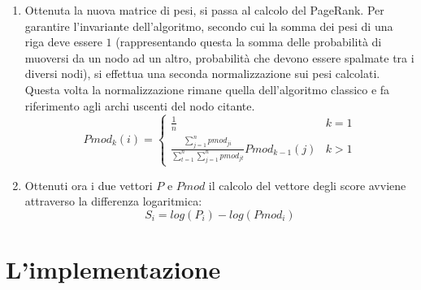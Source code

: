 \documentclass[a4paper, 12pt]{article}
\let\oldsection\section
\renewcommand\section{\clearpage\oldsection}
\newcommand{\pagerankModificato}{Pmod}
\newcommand{\pesiPagerankModificato}{pmod}
\begin{document}
\begin{enumerate}
  \item 
  Ottenuta la nuova matrice di pesi, si passa al calcolo del PageRank. Per garantire l'invariante dell'algoritmo, secondo cui la somma dei pesi di una riga deve essere $1$ (rappresentando questa la somma delle probabilità di muoversi da un nodo ad un altro, probabilità che devono essere spalmate tra i diversi nodi), si effettua una seconda normalizzazione sui pesi calcolati. Questa volta la normalizzazione rimane quella dell'algoritmo classico e fa riferimento agli archi uscenti del nodo citante.
  \[  
    \pagerankModificato_k(i) = 
    \begin{cases} 
      \displaystyle \frac{1}{n} & k = 1 \\
      \displaystyle \frac
        {\displaystyle \sum_{j=1}^{n} \pesiPagerankModificato_{ji}}
        {\displaystyle \sum_{t=1}^{n} {\sum_{j=1}^{n} \pesiPagerankModificato_{jt}}}
        \pagerankModificato_{k-1}(j) & k > 1 

    \end{cases} 
  \]
  
  \item
  Ottenuti ora i due vettori $P$ e $\pagerankModificato$ il calcolo del vettore degli score avviene attraverso la differenza logaritmica:
  \[
    S_i = log(P_i) - log(\pagerankModificato_i) 
  \]

\end{enumerate}

\section{L'implementazione}
\end{document}
